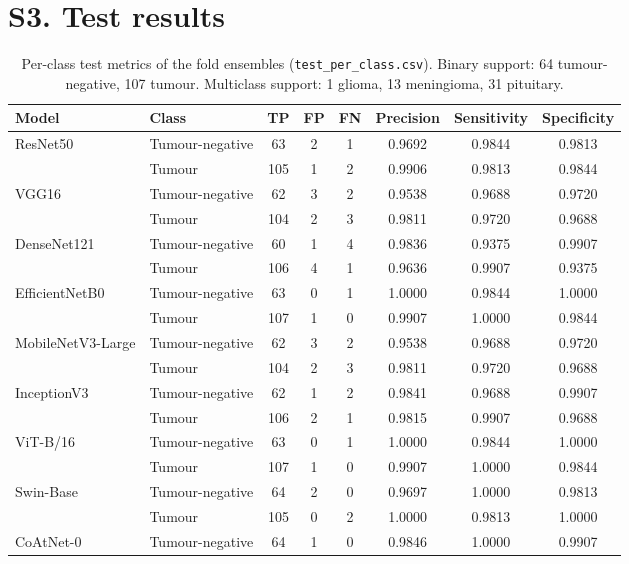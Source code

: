 \documentclass[11pt]{article}
\begin{document}
\FloatBarrier
\section*{S3. Test results}

\begin{table}[htbp]
\centering
\caption{Per-class test metrics of the fold ensembles (\texttt{test\_per\_class.csv}). Binary support: 64 tumour-negative, 107 tumour. Multiclass support: 1 glioma, 13 meningioma, 31 pituitary.}
\scriptsize
\begin{tabular*}{\textwidth}{@{\extracolsep{\fill}}llcccccc@{}}
\toprule
Model & Class & TP & FP & FN & Precision & Sensitivity & Specificity \\
\midrule
\multirow{2}{*}{ResNet50} & Tumour-negative & 63 & 2 & 1 & 0.9692 & 0.9844 & 0.9813 \\
 & Tumour & 105 & 1 & 2 & 0.9906 & 0.9813 & 0.9844 \\
\multirow{2}{*}{VGG16} & Tumour-negative & 62 & 3 & 2 & 0.9538 & 0.9688 & 0.9720 \\
 & Tumour & 104 & 2 & 3 & 0.9811 & 0.9720 & 0.9688 \\
\multirow{2}{*}{DenseNet121} & Tumour-negative & 60 & 1 & 4 & 0.9836 & 0.9375 & 0.9907 \\
 & Tumour & 106 & 4 & 1 & 0.9636 & 0.9907 & 0.9375 \\
\multirow{2}{*}{EfficientNetB0} & Tumour-negative & 63 & 0 & 1 & 1.0000 & 0.9844 & 1.0000 \\
 & Tumour & 107 & 1 & 0 & 0.9907 & 1.0000 & 0.9844 \\
\multirow{2}{*}{MobileNetV3-Large} & Tumour-negative & 62 & 3 & 2 & 0.9538 & 0.9688 & 0.9720 \\
 & Tumour & 104 & 2 & 3 & 0.9811 & 0.9720 & 0.9688 \\
\multirow{2}{*}{InceptionV3} & Tumour-negative & 62 & 1 & 2 & 0.9841 & 0.9688 & 0.9907 \\
 & Tumour & 106 & 2 & 1 & 0.9815 & 0.9907 & 0.9688 \\
\multirow{2}{*}{ViT-B/16} & Tumour-negative & 63 & 0 & 1 & 1.0000 & 0.9844 & 1.0000 \\
 & Tumour & 107 & 1 & 0 & 0.9907 & 1.0000 & 0.9844 \\
\multirow{2}{*}{Swin-Base} & Tumour-negative & 64 & 2 & 0 & 0.9697 & 1.0000 & 0.9813 \\
 & Tumour & 105 & 0 & 2 & 1.0000 & 0.9813 & 1.0000 \\
\multirow{2}{*}{CoAtNet-0} & Tumour-negative & 64 & 1 & 0 & 0.9846 & 1.0000 & 0.9907 \\

\end{tabular*}
\end{table}
\end{document}
